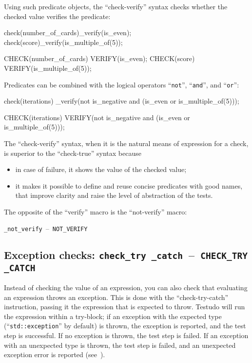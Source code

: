 \documentclass[twoside, a4paper, article]{memoir}
\newcommand*\testudocolor{\color{red!80!blue}}
\newcommand*\testudo[1]{\texttt{\testudocolor{}#1}}
\newcommand*\testudopair[2]{\testudo{#1}~--~\testudo{#2}}
\newcommand\subsectiontestudopair[3]{%
  \subsection[#1]{#1: \testudopair{#2}{#3}}}
\begin{document}
Using such predicate objects, the ``check-verify'' syntax checks whether the
checked value verifies the predicate:
\begin{cpplisting}
check(number_of_cards)_verify(is_even);
check(score)_verify(is_multiple_of(5));
\end{cpplisting}

\begin{cpplisting}
CHECK(number_of_cards) VERIFY(is_even);
CHECK(score) VERIFY(is_multiple_of(5));
\end{cpplisting}

Predicates can be combined with the logical operators ``\texttt{not}'',
``\texttt{and}'', and ``\texttt{or}'':
\begin{cpplisting}
check(iterations)
  _verify(not is_negative
          and (is_even or is_multiple_of(5)));
\end{cpplisting}

\begin{cpplisting}
CHECK(iterations)
  VERIFY(not is_negative
         and (is_even or is_multiple_of(5)));
\end{cpplisting}

The ``check-verify'' syntax, when it is the natural means of expression for a
check, is superior to the ``check-true'' syntax because
\begin{itemize}
\item in case of failure, it shows the value of the checked value;
\item it makes it possible to define and reuse concise predicates with good
  names, that improve clarity and raise the level of abstraction of the tests.
\end{itemize}

The opposite of the ``verify'' macro is the ``not-verify'' macro:
\begin{center}
  \testudopair{\_not\_verify}{NOT\_VERIFY}
\end{center}

\subsectiontestudopair{Exception checks}%
  {check\_try \_catch}{CHECK\_TRY \_CATCH}
\label{sec:exception-checks}

Instead of checking the value of an expression, you can also check that
evaluating an expression throws an exception.  This is done with the
``check-try-catch'' instruction, passing it the expression that is expected to
throw.  Testudo will run the expression within a try-block; if an exception
with the expected type (``\texttt{std::exception}'' by default) is thrown, the
exception is reported, and the test step is successful.  If no exception is
thrown, the test step is failed. If an exception with an unexpected type is
thrown, the test step is failed, and an unexpected exception error is reported
(see~).
\end{document}
